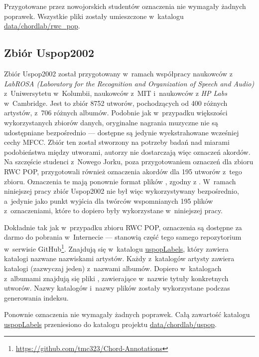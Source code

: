 Przygotowane przez nowojorskich studentów oznaczenia nie wymagały żadnych poprawek. Wszystkie pliki  zostały umieszczone w~katalogu \url{data/chordlab/rwc_pop}.

\subsection{Zbiór Uspop2002}

Zbiór Uspop2002 \cite{berenzweig_large-scale_2004} został przygotowany w~ramach współpracy naukowców z \emph{LabROSA (Laboratory for the Recognition and Organization of Speech and Audio)} z~Uniwersytetu w~Kolumbii, naukowców z~MIT i~naukowców z \emph{HP Labs} w~Cambridge. Jest to zbiór 8752 utworów, pochodzących od 400 różnych artystów, z~706 różnych albumów. Podobnie jak w~przypadku większości wykorzystanych zbiorów danych, oryginalne nagrania muzyczne nie są udostępniane bezpośrednio --- dostępne są jedynie wyekstrahowane wcześniej cechy MFCC. Zbiór ten został stworzony na potrzeby badań nad miarami podobieństwa między utworami, autorzy nie dostarczają więc oznaczeń akordów. Na szczęście studenci z~Nowego Jorku, poza przygotowaniem oznaczeń dla zbioru RWC POP, przygotowali również oznaczenia akordów dla 195 utworów z~tego zbioru. Oznaczenia te mają ponownie format plików , zgodny z \cite{harte_towards_nodate}. W~ramach niniejszej pracy zbiór Uspop2002 nie był więc wykorzystywany bezpośrednio, a~jedynie jako punkt wyjścia dla twórców wspomnianych 195 plików z~oznaczeniami, które to dopiero były wykorzystane w~niniejszej pracy.

Dokładnie tak jak w~przypadku zbioru RWC POP, oznaczenia są dostępne za darmo do pobrania w~Internecie --- stanowią część tego samego repozytorium w~serwisie GitHub\footnote{\url{https://github.com/tmc323/Chord-Annotations}}. Znajdują się w~katalogu \url{uspopLabels}, który zawiera katalogi nazwane nazwiskami artystów. Każdy z~katalogów artysty zawiera katalogi (zazwyczaj jeden) z~nazwami albumów. Dopiero w~katalogach z~albumami znajdują się pliki , zawierające w~nazwie tytuły konkretnych utworów. Nazwy katalogów i~nazwy plików zostały wykorzystane podczas generowania indeksu.

Ponownie oznaczenia nie wymagały żadnych poprawek. Całą zawartość katalogu \url{uspopLabels} przeniesiono do katalogu projektu \url{data/chordlab/uspop}.

